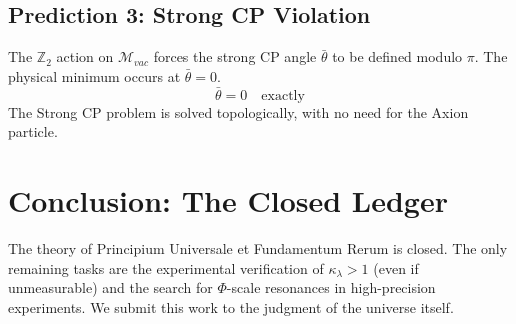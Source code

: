 \documentclass[12pt, a4paper]{article}
\begin{document}
\subsection{Prediction 3: Strong CP Violation}
The $\mathbb{Z}_2$ action on $\mathcal{M}_{vac}$ forces the strong CP angle $\bar{\theta}$ to be defined modulo $\pi$. The physical minimum occurs at $\bar{\theta}=0$.
$$\bar{\theta} = 0 \quad \text{exactly}$$
The Strong CP problem is solved topologically, with no need for the Axion particle.

\section{Conclusion: The Closed Ledger}
The theory of Principium Universale et Fundamentum Rerum is closed. The only remaining tasks are the experimental verification of $\kappa_{\lambda} > 1$ (even if unmeasurable) and the search for $\Phi$-scale resonances in high-precision experiments. We submit this work to the judgment of the universe itself.
\end{document}
